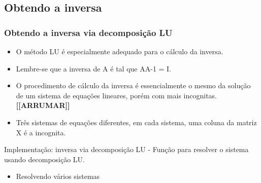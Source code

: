 \documentclass[
]{article}
\newenvironment{Shaded}{\begin{snugshade}}{\end{snugshade}}
\newcommand{\ControlFlowTok}[1]{\textcolor[rgb]{0.13,0.29,0.53}{\textbf{#1}}}
\newcommand{\FunctionTok}[1]{\textcolor[rgb]{0.13,0.29,0.53}{\textbf{#1}}}
\newcommand{\NormalTok}[1]{#1}
\newcommand{\OtherTok}[1]{\textcolor[rgb]{0.56,0.35,0.01}{#1}}
\newcommand{\SpecialCharTok}[1]{\textcolor[rgb]{0.81,0.36,0.00}{\textbf{#1}}}
\providecommand{\tightlist}{%
  \setlength{\itemsep}{0pt}\setlength{\parskip}{0pt}}
\begin{document}
\hypertarget{obtendo-a-inversa}{%
\subsection{Obtendo a inversa}\label{obtendo-a-inversa}}

\hypertarget{obtendo-a-inversa-via-decomposiuxe7uxe3o-lu}{%
\subsubsection{Obtendo a inversa via decomposição
LU}\label{obtendo-a-inversa-via-decomposiuxe7uxe3o-lu}}

\begin{itemize}
\item
  O método LU é especialmente adequado para o cálculo da inversa.
\item
  Lembre-se que a inversa de A é tal que AA-1 = I.
\item
  O procedimento de cálculo da inversa é essencialmente o mesmo da
  solução de um sistema de equações lineares, porém com mais incognitas.
  \textbf{{[}{[}ARRUMAR{]}{]}}
\item
  Três sistemas de equações diferentes, em cada sistema, uma coluna da
  matriz X é a incognita.
\end{itemize}

Implementação: inversa via decomposição LU - Função para resolver o
sistema usando decomposição LU.

\begin{Shaded}
\end{Shaded}

\begin{itemize}
\tightlist
\item
  Resolvendo vários sistemas
\end{itemize}
\end{document}
